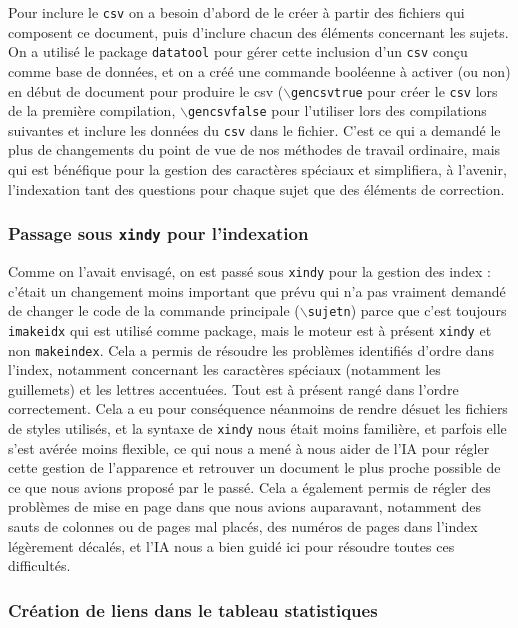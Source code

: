 Pour inclure le \texttt{csv} on a besoin d'abord de le créer à partir des fichiers qui composent ce document, puis d'inclure chacun des éléments concernant les sujets. On a utilisé le package \texttt{datatool} pour gérer cette inclusion d'un \texttt{csv} conçu comme base de données, et on a créé une commande booléenne à activer (ou non) en début de document pour produire le csv (\texttt{$\backslash$gencsvtrue} pour créer le \texttt{csv} lors de la première compilation, \texttt{$\backslash$gencsvfalse} pour l'utiliser lors des compilations suivantes et inclure les données du \texttt{csv} dans le fichier. C'est ce qui a demandé le plus de changements du point de vue de nos méthodes de travail ordinaire, mais qui est bénéfique pour la gestion des caractères spéciaux et simplifiera, à l'avenir, l'indexation tant des questions pour chaque sujet que des éléments de correction.

\subsubsection{Passage sous \texttt{xindy} pour l'indexation}

Comme on l'avait envisagé, on est passé sous \texttt{xindy} pour la gestion des index : c'était un changement moins important que prévu qui n'a pas vraiment demandé de changer le code de la commande principale (\texttt{$\backslash$sujetn}) parce que c'est toujours \texttt{imakeidx} qui est utilisé comme package, mais le moteur est à présent \texttt{xindy} et non \texttt{makeindex}. Cela a permis de résoudre les problèmes identifiés d'ordre dans l'index, notamment concernant les caractères spéciaux (notamment les guillemets) et les lettres accentuées. Tout est à présent rangé dans l'ordre correctement. Cela a eu pour conséquence néanmoins de rendre désuet les fichiers de styles utilisés, et la syntaxe de \texttt{xindy} nous était moins familière, et parfois elle s'est avérée moins flexible, ce qui nous a mené à nous aider de l'IA pour régler cette gestion de l'apparence et retrouver un document le plus proche possible de ce que nous avions proposé par le passé. Cela a également permis de régler des problèmes de mise en page dans que nous avions auparavant, notamment des sauts de colonnes ou de pages mal placés, des numéros de pages dans l'index légèrement décalés, et l'IA nous a bien guidé ici pour résoudre toutes ces difficultés.

\subsubsection{Création de liens dans le tableau statistiques}

